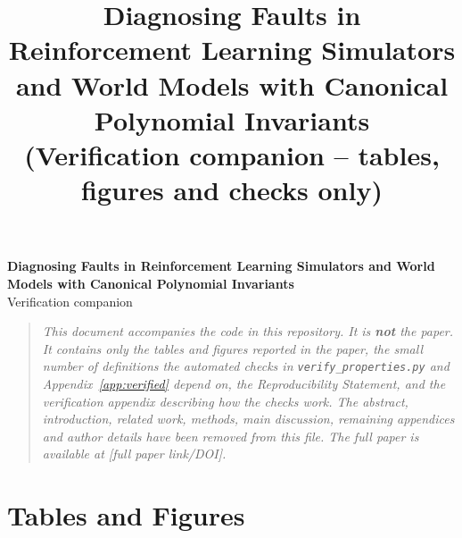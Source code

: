 \documentclass{article}
\title{Diagnosing Faults in Reinforcement Learning Simulators and World Models with Canonical Polynomial Invariants \\[4pt] \large (Verification companion -- tables, figures and checks only)}
\date{}
\begin{document}
\begin{center}
{\Large\bfseries Diagnosing Faults in Reinforcement Learning Simulators and World Models with Canonical Polynomial Invariants}\\[8pt]
{\large Verification companion}
\end{center}

\begin{quote}
\noindent\emph{This document accompanies the code in this repository. It is
\textbf{not} the paper. It contains only the tables and figures reported in
the paper, the small number of definitions the automated checks in
\texttt{verify\_properties.py} and Appendix~\ref{app:verified} depend on, the
Reproducibility Statement, and the verification appendix describing how the
checks work. The abstract, introduction, related work, methods, main
discussion, remaining appendices and author details have been removed from
this file. The full paper is available at [full paper link/DOI].}
\end{quote}


\section{Tables and Figures}
\label{sec:floats}
\end{document}
